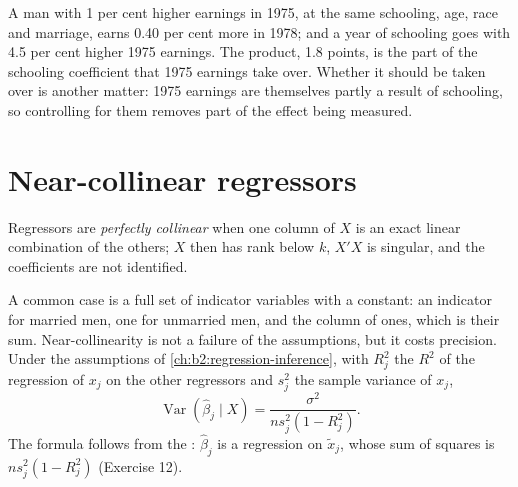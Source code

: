 \label{lst:b2:multiple-regression:ovb}

\label{out:b2:multiple-regression:ovb}

A man with 1 per cent higher earnings in 1975, at the same schooling, age, race and marriage, earns 0.40 per cent more in
1978; and a year of schooling goes with 4.5 per cent higher 1975 earnings. The product, 1.8 points, is the part of the
schooling coefficient that 1975 earnings take over. Whether it should be taken over is another matter: 1975 earnings are
themselves partly a result of schooling, so controlling for them removes part of the effect being measured.

\section{Near-collinear regressors}\label{sec:b2:multiple-regression:collinearity}

\begin{definition}\label{def:b2:multiple-regression:collinearity}
Regressors are \emph{perfectly collinear} when one column of $X$ is an exact linear
combination of the others; $X$ then has rank below $k$, $X'X$ is singular, and the coefficients are not identified.
\end{definition}

A common case is a full set of indicator variables with a constant: an indicator for married men, one for unmarried men,
and the column of ones, which is their sum. Near-collinearity is not a failure of the assumptions, but it costs precision.
Under the assumptions of \cref{ch:b2:regression-inference}, with $R_j^2$ the $R^2$ of the regression of $x_j$ on the
other regressors and $s_j^2$ the sample variance of $x_j$,
\begin{equation}\label{eq:b2:multiple-regression:var}
\operatorname{Var}(\hat\beta_j \mid X) = \frac{\sigma^2}{ns_j^2(1 - R_j^2)}.
\end{equation}
The formula follows from the : $\hat\beta_j$ is a regression on $\tilde x_j$, whose sum of
squares is $ns_j^2(1 - R_j^2)$ (Exercise 12).

